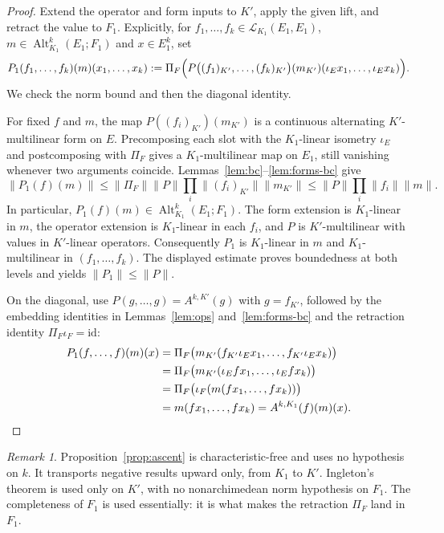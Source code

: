 \documentclass[11pt]{amsart}
\theoremstyle{definition}
\theoremstyle{remark}
\newtheorem{remark}[theorem]{Remark}
\numberwithin{equation}{section}
\newcommand{\cL}{\mathcal L}
\newcommand{\Alt}{\operatorname{Alt}}
\newcommand{\id}{\mathrm{id}}
\newcommand{\norm}[1]{\lVert #1\rVert}
\begin{document}
\begin{proof}
Extend the operator and form inputs to $K'$, apply the given lift, and retract the value to $F_1$. Explicitly,
for $f_1,\dots,f_k\in\cL_{K_1}(E_1,E_1)$, $m\in\Alt^k_{K_1}(E_1;F_1)$ and $x\in E_1^k$, set
\[
P_1(f_1,\dots,f_k)(m)(x_1,\dots,x_k):=
\Pi_F\Bigl(P\bigl((f_1)_{K'},\dots,(f_k)_{K'}\bigr)(m_{K'})(\iota_Ex_1,\dots,\iota_Ex_k)\Bigr).
\]
We check the norm bound and then the diagonal identity.

For fixed $f$ and $m$, the map $P((f_i)_{K'})(m_{K'})$ is a continuous alternating $K'$\nobreakdash-multilinear form
on $E$. Precomposing each slot with the $K_1$\nobreakdash-linear isometry $\iota_E$ and postcomposing with
$\Pi_F$ gives a $K_1$\nobreakdash-multilinear map on $E_1$, still vanishing whenever two arguments coincide.
Lemmas~\ref{lem:bc}--\ref{lem:forms-bc} give
\[
\norm{P_1(f)(m)}
\le\norm{\Pi_F}\norm P\prod_i\norm{(f_i)_{K'}}\norm{m_{K'}}
\le\norm P\prod_i\norm{f_i}\norm m.
\]
In particular, $P_1(f)(m)\in\Alt^k_{K_1}(E_1;F_1)$.
The form extension is $K_1$\nobreakdash-linear in $m$, the operator extension is $K_1$\nobreakdash-linear in each
$f_i$, and $P$ is $K'$\nobreakdash-multilinear with values in $K'$\nobreakdash-linear operators.
Consequently $P_1$ is $K_1$\nobreakdash-linear in $m$ and $K_1$\nobreakdash-multilinear in $(f_1,\dots,f_k)$.
The displayed estimate proves boundedness at both levels and yields $\norm{P_1}\le\norm P$.

On the diagonal, use $P(g,\dots,g)=A^{k,K'}(g)$ with $g=f_{K'}$, followed by the embedding identities in
Lemmas~\ref{lem:ops} and~\ref{lem:forms-bc} and the retraction identity $\Pi_F\iota_F=\id$:
\begin{align*}
P_1(f,\dots,f)(m)(x)
&=\Pi_F\bigl(m_{K'}(f_{K'}\iota_Ex_1,\dots,f_{K'}\iota_Ex_k)\bigr)\\
&=\Pi_F\bigl(m_{K'}(\iota_Efx_1,\dots,\iota_Efx_k)\bigr)\\
&=\Pi_F\bigl(\iota_F(m(fx_1,\dots,fx_k))\bigr)\\
&=m(fx_1,\dots,fx_k)=A^{k,K_1}(f)(m)(x).\qedhere
\end{align*}
\end{proof}

\begin{remark}\label{rem:ascent}
Proposition~\ref{prop:ascent} is characteristic-free and uses no hypothesis on $k$. It transports negative results
upward only, from $K_1$ to $K'$. Ingleton's theorem is used only on $K'$, with no nonarchimedean norm hypothesis on $F_1$. The completeness of $F_1$ is used essentially: it is what makes the retraction $\Pi_F$ land in $F_1$.
\end{remark}
\end{document}
